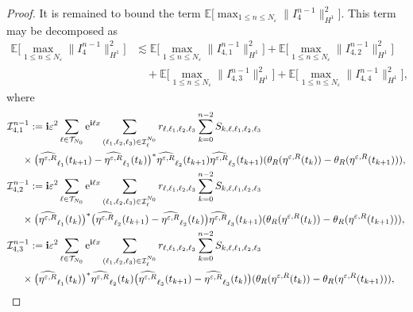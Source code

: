 \documentclass[a4paper]{amsart}
\begin{document}
\begin{proof}
   It is remained to bound the term $\mathbb{E}\big[\displaystyle\max_{1\le n\le N_\varepsilon}\|I_{4}^{n-1}\|^2_{H^1}\big]$. This term may be decomposed as
   \begin{align*}
   \mathbb{E}\big[\max_{1\le n\le N_\varepsilon}\|I_{4}^{n-1}\|^2_{H^1}\big]&\lesssim \mathbb{E}\big[\max_{1\le n\le N_\varepsilon}\|I_{4,1}^{n-1}\|^2_{H^1}\big]+\mathbb{E}\big[\max_{1\le n\le N_\varepsilon}\|I_{4,2}^{n-1}\|^2_{H^1}\big]\\
   &\quad +\mathbb{E}\big[\max_{1\le n\le N_\varepsilon}\|I_{4,3}^{n-1}\|^2_{H^1}\big]+\mathbb{E}\big[\max_{1\le n \le N_\varepsilon}\|I_{4,4}^{n-1}\|^2_{H^1}\big],
   \end{align*}
   where 
   \begin{align*}
       &\mathcal{I}_{4,1}^{n-1}:={\bf i}\varepsilon^2 \sum_{\ell\in\mathcal{T}_{N_0}}{\rm e}^{{\bf i}\ell x}\sum_{(\ell_1,\ell_2,\ell_3)\in\mathcal{I}_{\ell}^{N_0}}
    r_{\ell,\ell_1,\ell_2,\ell_3}\sum_{k=0}^{n-2}S_{k,\ell,\ell_1,\ell_2,\ell_3}\\
    &\hspace{0.5cm}\times \big(\widehat{\eta^{\varepsilon,R}}_{\ell_1}(t_{k+1})-\widehat{\eta^{\varepsilon,R}}_{\ell_1}(t_{k})\big)^*\widehat{\eta^{\varepsilon,R}}_{\ell_2}(t_{k+1})\widehat{\eta^{\varepsilon,R}}_{\ell_3}(t_{k+1})(\theta_R(\eta^{\varepsilon,R}(t_k))-\theta_R(\eta^{\varepsilon,R}(t_{k+1}))),\\ 
    &\mathcal{I}_{4,2}^{n-1}:={\bf i}\varepsilon^2 \sum_{\ell\in\mathcal{T}_{N_0}}{\rm e}^{{\bf i}\ell x}\sum_{(\ell_1,\ell_2,\ell_3)\in\mathcal{I}_{\ell}^{N_0}}
    r_{\ell,\ell_1,\ell_2,\ell_3}\sum_{k=0}^{n-2}S_{k,\ell,\ell_1,\ell_2,\ell_3}\\
    &\hspace{0.5cm}\times \big(\widehat{\eta^{\varepsilon,R}}_{\ell_1}(t_{k})\big)^*\big(\widehat{\eta^{\varepsilon,R}}_{\ell_2}(t_{k+1})-\widehat{\eta^{\varepsilon,R}}_{\ell_2}(t_{k})\big)\widehat{\eta^{\varepsilon,R}}_{\ell_3}(t_{k+1})(\theta_R(\eta^{\varepsilon,R}(t_k))-\theta_R(\eta^{\varepsilon,R}(t_{k+1}))),\\ 
    &\mathcal{I}_{4,3}^{n-1}:={\bf i}\varepsilon^2 \sum_{\ell\in\mathcal{T}_{N_0}}{\rm e}^{{\bf i}\ell x}\sum_{(\ell_1,\ell_2,\ell_3)\in\mathcal{I}_{\ell}^{N_0}}
    r_{\ell,\ell_1,\ell_2,\ell_3}\sum_{k=0}^{n-2}S_{k,\ell,\ell_1,\ell_2,\ell_3}\\
    &\hspace{0.5cm}\times \big(\widehat{\eta^{\varepsilon,R}}_{\ell_1}(t_{k})\big)^*\widehat{\eta^{\varepsilon,R}}_{\ell_2}(t_{k})\big(\widehat{\eta^{\varepsilon,R}}_{\ell_3}(t_{k+1})-\widehat{\eta^{\varepsilon,R}}_{\ell_3}(t_{k})\big)(\theta_R(\eta^{ \varepsilon,R}(t_k))-\theta_R(\eta^{\varepsilon,R}(t_{k+1}))),\\ 

\end{align*}
\end{proof}
\end{document}
